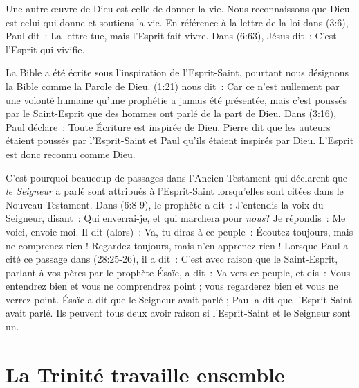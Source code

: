 Une autre œuvre de Dieu est celle de donner la vie. Nous reconnaissons que Dieu
 est celui qui donne et soutiens la vie.
 En référence à la lettre de la loi dans (3:6),
 Paul dit~: \og La lettre tue, mais l'Esprit fait vivre. \fg{}
 Dans (6:63), Jésus dit~: \og C'est l'Esprit qui vivifie.\fg{}

La Bible a été écrite sous l'inspiration de l'Esprit-Saint, pourtant nous
 désignons la Bible comme la Parole de Dieu.
 (1:21) nous dit~:
 \og Car ce n'est nullement par une volonté humaine qu'une prophétie a jamais
 été présentée, mais c'est poussés par le Saint-Esprit que des hommes ont parlé
 de la part de Dieu. \fg{}
 Dans (3:16), Paul déclare~:
 \og Toute Écriture est inspirée de Dieu. \fg{}
 Pierre dit que les auteurs étaient poussés par l'Esprit-Saint et Paul qu'ils
 étaient inspirés par Dieu. L'Esprit est donc reconnu comme Dieu.

C'est pourquoi beaucoup de passages dans l'Ancien Testament qui déclarent que
 \emph{le Seigneur} a parlé sont attribués à l'Esprit-Saint lors\-qu'elles
 sont citées dans le Nouveau Testament.
 Dans (6:8-9), le prophète a dit~: \og J'entendis la voix du
 Seigneur, disant~: Qui enverrai-je, et qui marchera pour \emph{nous}? Je répondis~:
 Me voici, envoie-moi. Il dit (alors)~: Va, tu diras à ce peuple~:
 Écoutez toujours, mais ne comprenez rien ! Regardez toujours, mais n'en
 apprenez rien ! \fg{}
 Lorsque Paul a cité ce passage dans (28:25-26), il a dit~:
 \og C'est avec raison que le Saint-Esprit, parlant à vos pères par le
 prophète Ésaïe, a dit~: Va vers ce peuple, et dis~: Vous entendrez bien et
 vous ne comprendrez point ; vous regarderez bien et vous ne verrez point. \fg{}
 Ésaïe a dit que le Seigneur avait parlé ; Paul a dit que l'Esprit-Saint
 avait parlé.
 Ils peuvent tous deux avoir raison si l'Esprit-Saint et le Seigneur sont un.


\section{La Trinit\'e travaille ensemble}

